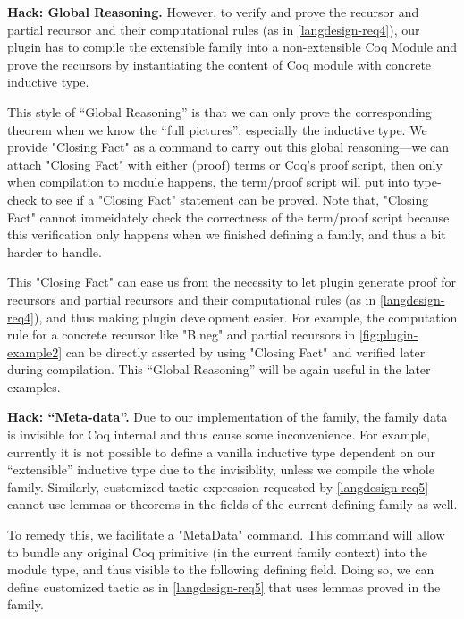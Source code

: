 
\textbf{Hack: Global Reasoning.}
However, to verify and prove the recursor and partial recursor and their computational rules (as in \ref{langdesign-req4}), our plugin has to compile the extensible family into a non-extensible Coq Module and prove the recursors by instantiating the content of Coq module with concrete inductive type.  

This style of ``Global Reasoning'' is that we can only prove the corresponding theorem when we know the ``full pictures'', especially the inductive type. We provide "Closing Fact" as a command to carry out this global reasoning---we can attach "Closing Fact" with either (proof) terms or Coq's proof script, then only when compilation to module happens, the term/proof script will put into type-check to see if a "Closing Fact" statement can be proved. Note that, "Closing Fact" cannot immeidately check the correctness of the term/proof script because this verification only happens when we finished defining a family, and thus a bit harder to handle.

This "Closing Fact" can ease us from the necessity to let plugin generate proof for recursors and partial recursors and their computational rules (as in \ref{langdesign-req4}), and thus making plugin development easier. For example, the computation rule for a concrete recursor like "B.neg" and partial recursors in \cref{fig:plugin-example2} can be directly asserted by using "Closing Fact" and verified later during compilation. This ``Global Reasoning'' will be again useful in the later examples.

\textbf{Hack: ``Meta-data''.} Due to our implementation of the family, the family data is invisible for Coq internal and thus cause some inconvenience.  For example, currently it is not possible to define a vanilla inductive type dependent on our ``extensible'' inductive type due to the invisiblity, unless we compile the whole family. Similarly, customized tactic expression requested by \ref{langdesign-req5} cannot use lemmas or theorems in the fields of the current defining family as well.

To remedy this, we facilitate a "MetaData" command. This command will allow to bundle any original Coq primitive (in the current family context) into the module type, and thus visible to the following defining field. Doing so, we can define customized tactic as in \ref{langdesign-req5} that uses lemmas proved in the family. 